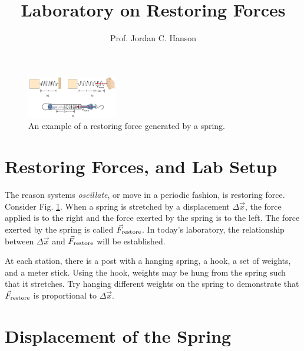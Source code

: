\documentclass{article}
\begin{document}
\twocolumn

\title{Laboratory on Restoring Forces}
\author{Prof. Jordan C. Hanson}

\maketitle

\begin{figure}[ht]
\centering
\includegraphics[width=0.35\textwidth]{figures/force1.png}
\caption{\label{fig:restore} An example of a restoring force generated by a spring.}
\end{figure}

\section{Restoring Forces, and Lab Setup}

The reason systems \textit{oscillate}, or move in a periodic fashion, is restoring force.  Consider Fig. \ref{fig:restore}.  When a spring is stretched by a displacement $\Delta \vec{x}$, the force applied is to the right and the force exerted by the spring is to the left.  The force exerted by the spring is called $\vec{F}_{\rm restore}$.  In today's laboratory, the relationship between $\Delta \vec{x}$ and $\vec{F}_{\rm restore}$ will be established.

At each station, there is a post with a hanging spring, a hook, a set of weights, and a meter stick.  Using the hook, weights may be hung from the spring such that it stretches.  Try hanging different weights on the spring to demonstrate that $\vec{F}_{\rm restore}$ is proportional to $\Delta \vec{x}$.

\section{Displacement of the Spring}
\end{document}
